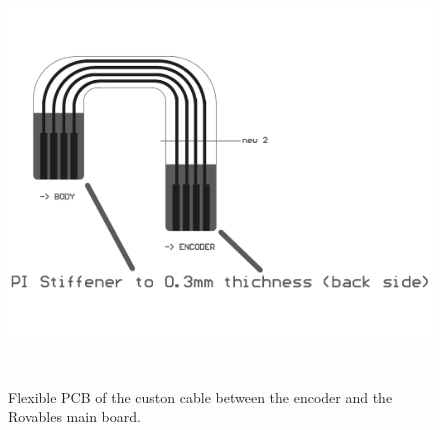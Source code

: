 \begin{figure}[t]
\centering
  \centerline{\includegraphics[origin=c, width=0.8\paperwidth]{pictures/appendix/cable_ir_encoder.pdf}}
  \caption{Flexible PCB of the custon cable between the encoder and the Rovables main board. }~\label{fig:cable_encoder_board}
\end{figure}



%


